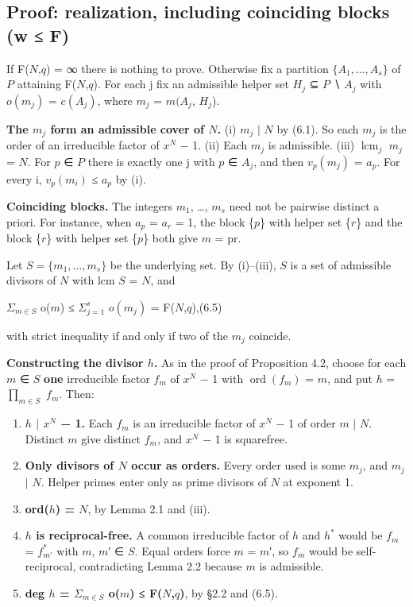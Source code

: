 \documentclass[pdflatex,sn-mathphys-num]{sn-jnl}
\providecommand{\tightlist}{\setlength{\itemsep}{0pt}\setlength{\parskip}{0pt}}
\theoremstyle{thmstyleone}
\theoremstyle{thmstylethree}
\begin{document}
\subsection{Proof: realization, including coinciding blocks (w ≤ F)}

If F(\(N\),\(q\)) = ∞ there is nothing to prove. Otherwise fix a partition \(\{A_1,\ldots,A_s\}\) of \(P\) attaining F(\(N\),\(q\)). For each j fix an admissible helper set \(H_j\) ⊆ \(P\) ∖ \(A_j\) with \(o(m_j)\) = \(c(A_j)\), where \(m_j\) = \(m(A_j\), \(H_j\)).

\textbf{The \(m_j\) form an admissible cover of \(N\).} (i) \(m_j\) \(\mid\) \(N\) by (6.1). So each \(m_j\) is the order of an irreducible factor of \(x^N\) − 1. (ii) Each \(m_j\) is admissible. (iii) \(\operatorname{lcm}_j\) \(m_j\) = \(N\). For \(p\) ∈ \(P\) there is exactly one j with \(p\) ∈ \(A_j\), and then \(v_p(m_j)\) = \(a_p\). For every i, \(v_p(m_i)\) ≤ \(a_p\) by (i).

\textbf{Coinciding blocks.} The integers \(m_1\), \ldots, \(m_s\) need not be pairwise distinct a priori. For instance, when \(a_p\) = \(a_r\) = 1, the block \{\(p\)\} with helper set \{\(r\)\} and the block \{\(r\)\} with helper set \{\(p\)\} both give \(m\) = pr.

Let \(S=\{m_1,\ldots,m_s\}\) be the underlying set. By (i)--(iii), \(S\) is a set of admissible divisors of \(N\) with lcm \(S\) = \(N\), and

\begin{center}\(Σ_{m∈S}\) o(\(m\)) ≤ \(Σ_{j=1}^{s}\) \(o(m_j)\) = F(\(N\),\(q\)),\qquad (6.5)\end{center}

with strict inequality if and only if two of the \(m_j\) coincide.

\textbf{Constructing the divisor \(h\).} As in the proof of Proposition 4.2, choose for each \(m\) ∈ \(S\) \textbf{one} irreducible factor \(f_m\) of \(x^N\) − 1 with \(\operatorname{ord}(f_m)\) = \(m\), and put \(h\) = \(∏_{m∈S}\) \(f_m\). Then:

\begin{enumerate}
\def\labelenumi{\arabic{enumi}.}
\tightlist
\item
  \textbf{\(h\) \(\mid\) \(x^N\) − 1.} Each \(f_m\) is an irreducible factor of \(x^N\) − 1 of order \(m\) \(\mid\) \(N\). Distinct \(m\) give distinct \(f_m\), and \(x^N\) − 1 is squarefree.
\item
  \textbf{Only divisors of \(N\) occur as orders.} Every order used is some \(m_j\), and \(m_j\) \(\mid\) \(N\). Helper primes enter only as prime divisors of \(N\) at exponent 1.
\item
  \textbf{ord(\(h\)) = \(N\)}, by Lemma 2.1 and (iii).
\item
  \textbf{\(h\) is reciprocal-free.} A common irreducible factor of \(h\) and \(h^{*}\) would be \(f_m\) = \(f_{m′}^{*}\) with \(m\), \(m\)′ ∈ \(S\). Equal orders force \(m\) = \(m\)′, so \(f_m\) would be self-reciprocal, contradicting Lemma 2.2 because \(m\) is admissible.
\item
  \textbf{deg \(h\) = \(Σ_{m∈S}\) o(\(m\)) ≤ F(\(N\),\(q\))}, by §2.2 and (6.5).
\end{enumerate}
\end{document}

